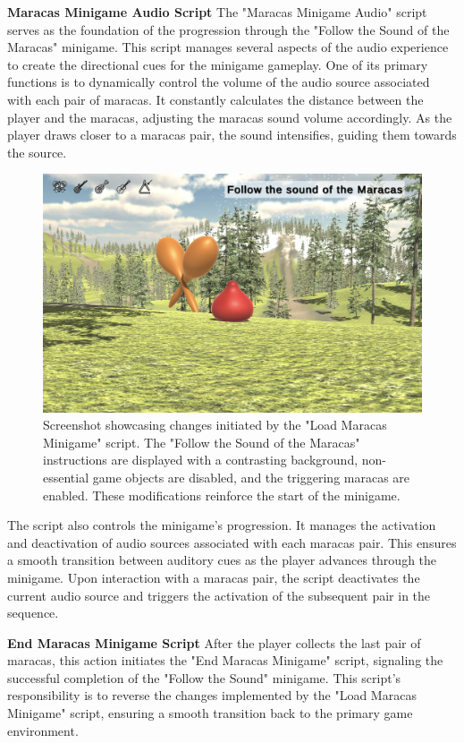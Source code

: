 \documentclass{l4proj}
\begin{document}
\textbf{Maracas Minigame Audio Script} \newline
The "Maracas Minigame Audio" script serves as the foundation of the progression through the "Follow the Sound of the Maracas" minigame. This script manages several aspects of the audio experience to create the directional cues for the minigame gameplay. One of its primary functions is to dynamically control the volume of the audio source associated with each pair of maracas. It constantly calculates the distance between the player and the maracas, adjusting the maracas sound volume accordingly. As the player draws closer to a maracas pair, the sound intensifies, guiding them towards the source.

\begin{figure}[h]
 \centering
 \includegraphics[width=0.7\linewidth]{dissertation/images/Maracas_Setup.png} 
 \caption{Screenshot showcasing changes initiated by the "Load Maracas Minigame" script. The "Follow the Sound of the Maracas" instructions are displayed with a contrasting background, non-essential game objects are disabled, and the triggering maracas are enabled. These modifications reinforce the start of the minigame.} 
 \label{fig:maracas_setup} 
\end{figure}

The script also controls the minigame's progression. It manages the activation and deactivation of audio sources associated with each maracas pair. This ensures a smooth transition between auditory cues as the player advances through the minigame. Upon interaction with a maracas pair, the script deactivates the current audio source and triggers the activation of the subsequent pair in the sequence.

\textbf{End Maracas Minigame Script} \newline
After the player collects the last pair of maracas, this action initiates the "End Maracas Minigame" script, signaling the successful completion of the "Follow the Sound" minigame. This script's responsibility is to reverse the changes implemented by the "Load Maracas Minigame" script, ensuring a smooth transition back to the primary game environment.
\end{document}
